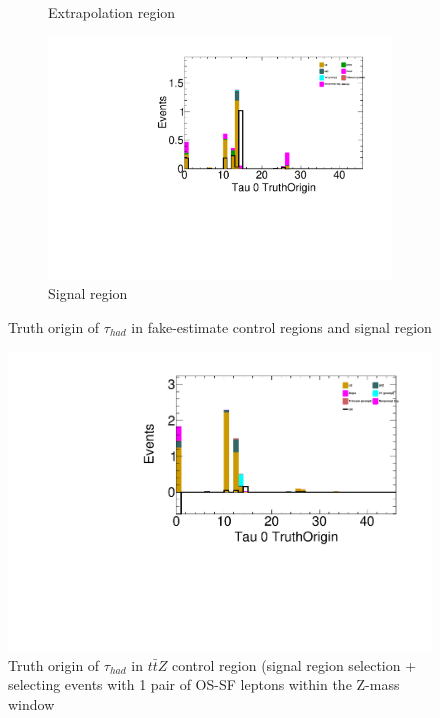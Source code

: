 \documentclass[11pt]{article}
\begin{document}
\begin{figure}[H]
\begin{subfigure}[b]{.5\textwidth}
			\caption{Extrapolation region}
		\end{subfigure}
		\quad
		\begin{subfigure}[b]{.5\textwidth}
			\includegraphics[width=0.82\linewidth]{figures/Plots_MC_April10_pp8-new_PromptPlots/3ltau_SR_TightLepMVA_TauMedium_Tau0TruthOrigin.pdf}
			\caption{Signal region}
		\end{subfigure}
		\caption{Truth origin of $\tau_{had}$ in fake-estimate control regions and signal region}
	\end{figure}
			
	\begin{figure}[H]
		\centering
		\includegraphics[width=0.65\linewidth]{figures/Plots_MC_April10_pp8-new_PromptPlots/3ltau_ttZ_CR_TightLepMVA_TauMedium_Tau0TruthOrigin.pdf}
		\caption{Truth origin of $\tau_{had}$ in $t\bar{t}Z$ control region (signal region selection + selecting events with 1 pair of OS-SF leptons within the Z-mass window}
	\end{figure}		
			
		
\end{document}
